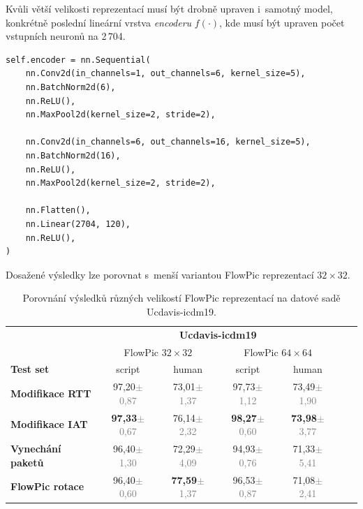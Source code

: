 Kvůli větší velikosti reprezentací musí být drobně upraven i~samotný model, konkrétně poslední lineární vrstva \textit{encoderu} $f(\cdot)$, kde musí být upraven počet vstupních neuronů na 2\,704.

\begin{lstlisting}[caption={Upravená implementace \textit{encoderu} $f(\cdot)$.}]
self.encoder = nn.Sequential(
    nn.Conv2d(in_channels=1, out_channels=6, kernel_size=5),
    nn.BatchNorm2d(6),
    nn.ReLU(),
    nn.MaxPool2d(kernel_size=2, stride=2),
    
    nn.Conv2d(in_channels=6, out_channels=16, kernel_size=5),
    nn.BatchNorm2d(16),
    nn.ReLU(),
    nn.MaxPool2d(kernel_size=2, stride=2),
    
    nn.Flatten(),
    nn.Linear(2704, 120),
    nn.ReLU(),
)
\end{lstlisting}

Dosažené výsledky lze porovnat s~menší variantou FlowPic reprezentací $32\times32$.
\begin{table}[H]
    \centering
    \begin{tabular}{lcccccc}
        \toprule
          & \multicolumn{4}{c}{\textbf{Ucdavis-icdm19}} \\
          \cmidrule(lr){2-5}
         & \multicolumn{2}{c}{FlowPic $32\times32$} & \multicolumn{2}{c}{FlowPic $64\times64$} \\
         \cmidrule(lr){2-3} \cmidrule(lr){4-5}
         \textbf{Test set} & script & human & script & human  \\
        \midrule
        \textbf{Modifikace RTT} & 97,20{\tiny\textcolor{gray}{$\pm$ 0,87}} & 73,01{\tiny\textcolor{gray}{$\pm$ 1,37}} & 97,73{\tiny\textcolor{gray}{$\pm$ 1,12}} & 73,49{\tiny\textcolor{gray}{$\pm$ 1,90}} \\
        \textbf{Modifikace IAT} & \textbf{97,33}{\tiny\textcolor{gray}{$\pm$ 0,67}} & 76,14{\tiny\textcolor{gray}{$\pm$ 2,32}} & \textbf{98,27}{\tiny\textcolor{gray}{$\pm$ 0,60}} & \textbf{73,98}{\tiny\textcolor{gray}{$\pm$ 3,77}} \\
        \textbf{Vynechání paketů} & 96,40{\tiny\textcolor{gray}{$\pm$ 1,30}} & 72,29{\tiny\textcolor{gray}{$\pm$ 4,09}} & 94,93{\tiny\textcolor{gray}{$\pm$ 0,76}} & 71,33{\tiny\textcolor{gray}{$\pm$ 5,41}} \\
        \textbf{FlowPic rotace} & 96,40{\tiny\textcolor{gray}{$\pm$ 0,60}} & \textbf{77,59}{\tiny\textcolor{gray}{$\pm$ 1,37}} & 96,53{\tiny\textcolor{gray}{$\pm$ 0,87}} & 71,08{\tiny\textcolor{gray}{$\pm$ 2,41}} \\
        \bottomrule
    \end{tabular}
    \caption{Porovnání výsledků různých velikostí FlowPic reprezentací na datové sadě Ucdavis-icdm19.}
\end{table}

